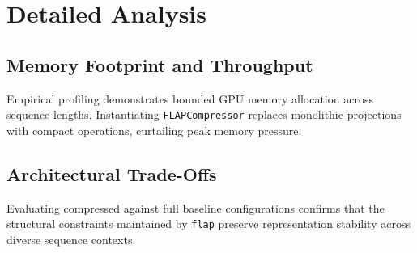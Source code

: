 \section{Detailed Analysis}

\subsection{Memory Footprint and Throughput}
Empirical profiling demonstrates bounded GPU memory allocation across sequence lengths. Instantiating \texttt{FLAPCompressor} replaces monolithic projections with compact operations, curtailing peak memory pressure.

\subsection{Architectural Trade-Offs}
Evaluating compressed against full baseline configurations confirms that the structural constraints maintained by \texttt{flap} preserve representation stability across diverse sequence contexts.
